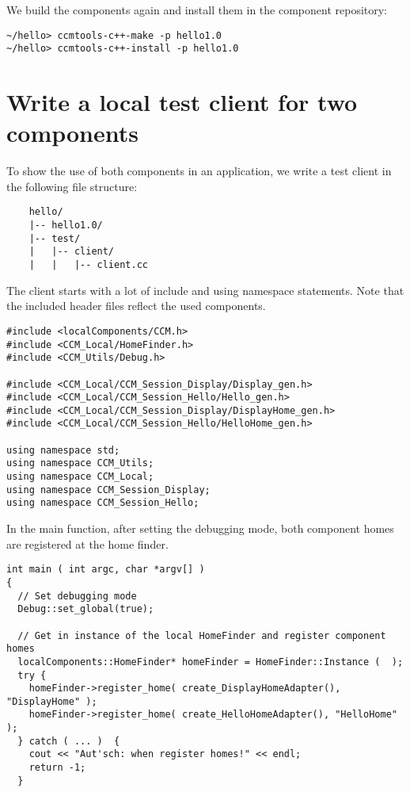 \noindent
We build the components again and install them in the component repository:
\begin{verbatim}
~/hello> ccmtools-c++-make -p hello1.0
~/hello> ccmtools-c++-install -p hello1.0
\end{verbatim}



\section{Write a local test client for two components}

To show the use of both components in an application, we write a test client in the
following file structure:
\begin{verbatim}
    hello/
    |-- hello1.0/
    |-- test/
    |   |-- client/
    |   |   |-- client.cc 
\end{verbatim}

\noindent
The client starts with a lot of include and using namespace statements.
Note that the included header files reflect the used components.
\begin{small}
\begin{verbatim}
#include <localComponents/CCM.h>
#include <CCM_Local/HomeFinder.h>
#include <CCM_Utils/Debug.h>

#include <CCM_Local/CCM_Session_Display/Display_gen.h>
#include <CCM_Local/CCM_Session_Hello/Hello_gen.h>
#include <CCM_Local/CCM_Session_Display/DisplayHome_gen.h>
#include <CCM_Local/CCM_Session_Hello/HelloHome_gen.h>

using namespace std;
using namespace CCM_Utils;
using namespace CCM_Local;
using namespace CCM_Session_Display;
using namespace CCM_Session_Hello;
\end{verbatim}
\end{small}

\noindent
In the main function, after setting the debugging mode, 
both component homes are registered at the home finder.
\begin{small}
\begin{verbatim}
int main ( int argc, char *argv[] )
{
  // Set debugging mode
  Debug::set_global(true);

  // Get in instance of the local HomeFinder and register component homes
  localComponents::HomeFinder* homeFinder = HomeFinder::Instance (  );
  try {                       
    homeFinder->register_home( create_DisplayHomeAdapter(), "DisplayHome" );
    homeFinder->register_home( create_HelloHomeAdapter(), "HelloHome" );
  } catch ( ... )  {
    cout << "Aut'sch: when register homes!" << endl;
    return -1;
  }
\end{verbatim}
\end{small}

